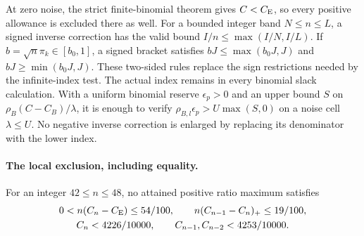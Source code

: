 At zero noise, the strict finite-binomial theorem gives $C<C_{\mathrm E}$,
so every positive allowance is excluded there as well.
For a bounded integer band $N\le n\le L$, a signed inverse correction
has the valid bound $I/n\le\max(I/N,I/L)$. If
$b=\sqrt n\pi_k\in[b_0,1]$, a signed bracket satisfies
$bJ\le\max(b_0J,J)$ and $bJ\ge\min(b_0J,J)$.
These two-sided rules replace the sign restrictions needed by the
infinite-index test. The actual index remains in every binomial slack
calculation. With a uniform binomial reserve $\epsilon_p>0$ and an
upper bound $S$ on $\rho_B(C-C_B)/\lambda$, it is enough to verify
$\rho_{B,l}\epsilon_p>U\max(S,0)$ on a noise cell $\lambda\le U$.
No negative inverse correction is enlarged by replacing its denominator
with the lower index.

\paragraph{The local exclusion, including equality.}\label{j:local:comparison}
\begin{proposition}\label{j:local:finite42}
For an integer $42\le n\le48$, no attained positive ratio maximum satisfies
\begin{gather*}
 0<n(C_n-C_{\mathrm E})\le54/100,\qquad n(C_{n-1}-C_n)_+\le19/100,\\
 C_n<4226/10000,\qquad C_{n-1},C_{n-2}<4253/10000.
\end{gather*}
\end{proposition}
